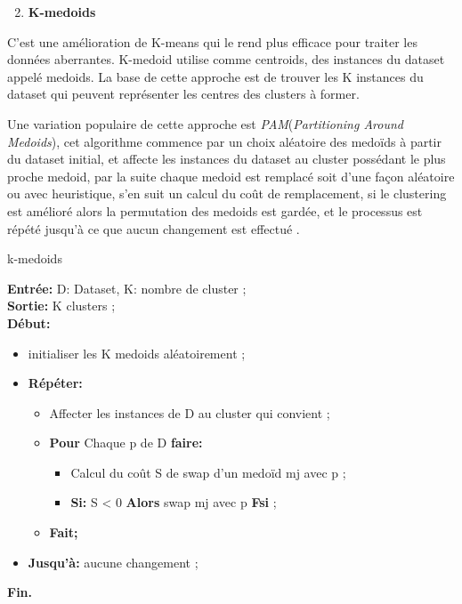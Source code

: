 \begin{enumerate}[nosep,label=\textbf{\arabic*)}]
	\setcounter{enumi}{1}
	\item \textbf{K-medoids}
\end{enumerate}\mbox{}\indent C’est une amélioration  de K-means qui le rend plus efficace pour traiter les données aberrantes. K-medoid utilise comme centroids, des instances du dataset  appelé medoids. La base de cette approche est de trouver les K instances du dataset qui peuvent représenter les centres des clusters à former. 

Une variation populaire de cette approche est \textit{PAM}(\textit{Partitioning Around Medoids}), cet algorithme commence par un choix aléatoire des medoïds à partir du dataset initial, et affecte les instances du dataset au cluster possédant le plus proche medoid, par la suite chaque medoid est remplacé soit d'une façon aléatoire ou avec heuristique, s'en suit un calcul du coût de remplacement, si le clustering est amélioré alors la permutation des medoids est gardée, et le processus est répété jusqu'à ce que aucun changement est effectué \cite{ref33}.


 \begin{algorithm}[H]
	\caption{k-medoids}
	\hspace*{\algorithmicindent} \textbf{Entrée:} D: Dataset, K: nombre de cluster ;\\
	\hspace*{\algorithmicindent} \textbf{Sortie:} K clusters ; \\
	\hspace*{\algorithmicindent}\textbf{ Début:}
	\begin{itemize}
			\item [] initialiser les K medoids aléatoirement ;
		
		\item []\textbf{Répéter:}
		\begin{itemize}
			\item [] Affecter les instances de D au cluster qui convient ;
			\item []\textbf{Pour} Chaque p de D \textbf{faire:} 
			\begin{itemize}
			\item [] Calcul du coût S de swap d’un medoïd mj avec p ;
			 \item []\textbf{Si:} S < 0 \textbf{Alors} swap mj avec p \textbf{Fsi} ;
			\end{itemize}
			\item []\textbf{Fait;}
		\end{itemize}
		\item []\textbf{Jusqu'à: }aucune changement ;
		
	\end{itemize}
	\hspace*{\algorithmicindent}\textbf{ Fin.}
\end{algorithm} 


